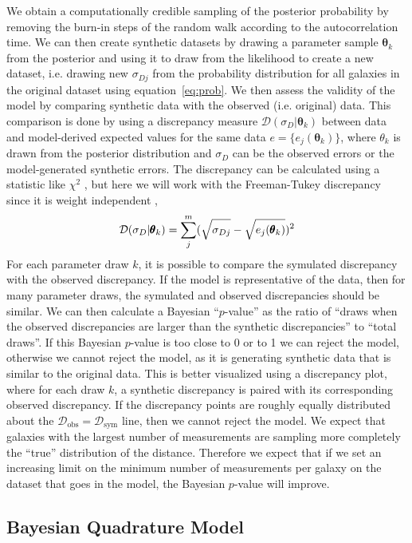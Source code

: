 \documentclass[a4paper,fleqn,usenatbib]{mnras}
\begin{document}
We obtain a computationally credible sampling of the posterior probability by removing the burn-in steps of the random walk according to the autocorrelation time. We can then create synthetic datasets by drawing a parameter sample $\pmb{\theta}_k$ from the posterior and using it to draw from the likelihood to create a new dataset, i.e. drawing new $\sigma_{Dj}$ from the probability distribution for all galaxies in the original dataset using equation~\ref{eq:prob}. We then assess the validity of the model by comparing synthetic data with the observed (i.e. original) data. This comparison is done by using a discrepancy measure $\mathcal{D}(\sigma_D|\pmb{\theta}_k)$ between data and model-derived expected values for the same data $e=\{e_j(\pmb{\theta}_k)\}$, where $\theta_k$ is drawn from the posterior distribution and $\sigma_D$ can be the observed errors or the model-generated synthetic errors. The discrepancy can be calculated using a statistic like $\chi^2$ \citep{chi2ms,otherdisc}, but here we will work with the Freeman-Tukey discrepancy since it is weight independent \citep{bishopft,brooks}, 
\[\mathcal{D}(\sigma_D|\pmb{\theta}_k)=\sum_j^m(\sqrt{\sigma_{Dj}\vphantom{e_j(\pmb{\theta}_k)}}-\sqrt{e_j(\pmb{\theta}_k)})^2\]
For each parameter draw $k$, it is possible to compare the symulated discrepancy with the observed discrepancy. If the model is representative of the data, then for many parameter draws, the symulated and observed discrepancies should be similar. We can then calculate a Bayesian ``$p$-value'' as the ratio of ``draws when the observed discrepancies are larger than the synthetic discrepancies'' to ``total draws''. If this Bayesian $p$-value is too close to 0 or to 1 we can reject the model, otherwise we cannot reject the model, as it is generating synthetic data that is similar to the original data. This is better visualized using a discrepancy plot, where for each draw $k$, a synthetic discrepancy is paired with its corresponding observed discrepancy. If the discrepancy points are roughly equally distributed about the $\mathcal{D}_\mathrm{obs}=\mathcal{D}_\mathrm{sym}$ line, then we cannot reject the model. We expect that galaxies with the largest number of measurements are sampling more completely the ``true'' distribution of the distance. Therefore we expect that if we set an increasing limit on the minimum number of measurements per galaxy on the dataset that goes in the model, the Bayesian $p$-value will improve.

\subsection{Bayesian Quadrature Model}
\label{sec:bqm} 
\end{document}

